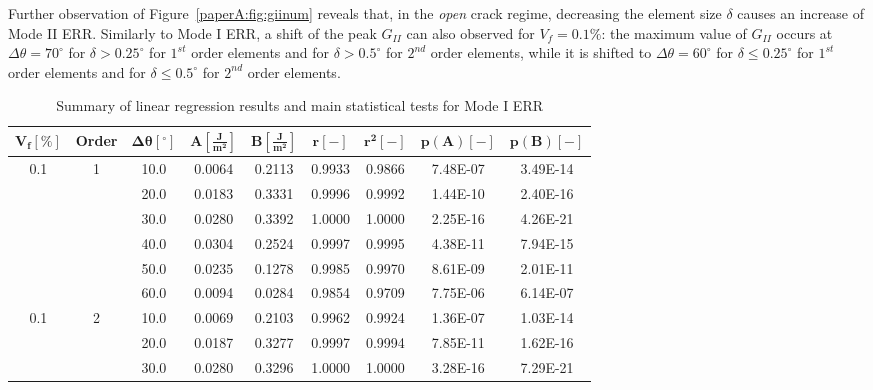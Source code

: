 Further observation of Figure~\ref{paperA:fig:giinum} reveals that, in the \emph{open} crack regime, decreasing the element size $\delta$ causes an increase of Mode II ERR. Similarly to Mode I ERR, a shift of the peak $G_{II}$ can also observed for $V_{f}=0.1\%$: the maximum value of $G_{II}$ occurs at $\Delta\theta=70^{\circ}$ for $\delta>0.25^{\circ}$ for $1^{st}$ order elements and for $\delta>0.5^{\circ}$ for $2^{nd}$ order elements, while it is shifted to $\Delta\theta=60^{\circ}$ for $\delta\leq0.25^{\circ}$ for $1^{st}$ order elements and for $\delta\leq0.5^{\circ}$ for $2^{nd}$ order elements.

\begin{table}[!h]
 \centering
 \caption{Summary of linear regression results and main statistical tests for Mode I ERR}\label{paperA:tab:GIinterp}
 \begin{tabular}{ccccccccc}
\\
\small$\mathbf{V_{f} \left[\%\right]}$&\small\bf{Order}&\small$\mathbf{\Delta\theta \left[^{\circ}\right]}$&\small$\mathbf{A\left[\frac{J}{m^{2}}\right]}$ &\small$\mathbf{B\left[\frac{J}{m^{2}}\right]}$ &\small $\mathbf{r\left[-\right]}$ &\small $\mathbf{r^{2}\left[-\right]}$ &\small $\mathbf{p(A)\left[-\right]}$ &\small $\mathbf{p(B)\left[-\right]}$\\
\toprule
\midrule
\small0.1&\small1&	\small10.0&	\small0.0064&	\small0.2113&	\small0.9933&	\small0.9866&	\small7.48E-07&	\small3.49E-14\\
&&		\small20.0& \small0.0183&\small	0.3331&\small	0.9996&\small	0.9992&\small	1.44E-10&\small	2.40E-16\\
&&		\small30.0&	\small0.0280&\small	0.3392&\small	1.0000&\small	1.0000&\small	2.25E-16&\small	4.26E-21\\
&&		\small40.0&	\small0.0304&\small	0.2524&\small	0.9997&\small	0.9995&\small	4.38E-11&\small	7.94E-15\\
&&		\small50.0&	\small0.0235&\small	0.1278&\small	0.9985&\small	0.9970&\small	8.61E-09&\small	2.01E-11\\
&&		\small60.0&	\small0.0094&\small	0.0284&\small	0.9854&\small	0.9709&\small	7.75E-06&\small	6.14E-07\\
\midrule
\small0.1&\small2&	\small10.0&	\small0.0069&	\small0.2103&	\small0.9962&	\small0.9924&	\small1.36E-07&	\small1.03E-14\\
&&		\small20.0&	\small0.0187&\small	0.3277&\small	0.9997&\small	0.9994&\small	7.85E-11&\small	1.62E-16\\
&&		\small30.0&	\small0.0280&\small	0.3296&\small	1.0000&\small	1.0000&\small	3.28E-16&\small	7.29E-21\\

\end{tabular}
\end{table}
